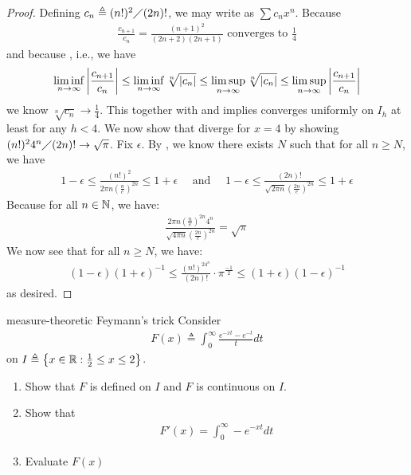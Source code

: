\documentclass{report}
\begin{document}
\begin{proof}
Defining $c_n\triangleq (n!)^2 \diagup (2n)!$, we may write   as $\sum c_n x^n$. Because 
\begin{align*}
\frac{c_{n+1}}{c_n}= \frac{(n+1)^2}{(2n+2)(2n+1)}\text{ converges to }\frac{1}{4}
\end{align*}
and because , i.e., we have 
\begin{align*}
  \liminf_{n\to\infty} \left|\frac{c_{n+1}}{c_n}\right| \leq \liminf_{n\to\infty} \sqrt[n]{\left|c_n\right|}\leq \limsup_{n\to\infty} \sqrt[n]{\left|c_n\right|} \leq \limsup_{n\to\infty} \left|\frac{c_{n+1}}{c_n}\right|
\end{align*}
we know $\sqrt[n]{c_n} \rightarrow \frac{1}{4} $. This together with  and  implies  converges uniformly on $I_h$ at least for any $h<4$. We now show that  diverge for $x=4$ by showing $(n!)^24^n \diagup (2n)! \rightarrow \sqrt{\pi }$. Fix $\epsilon $. By , we know there exists $N$ such that for all  $n\geq N$, we have  
\begin{align*}
1-\epsilon  \leq \frac{(n!)^2}{2\pi  n\left( \frac{n}{e} \right)^{2n} }  \leq 1+\epsilon \quad \text{ and }\quad  1- \epsilon \leq \frac{(2n)!}{\sqrt{2\pi  n} \left(\frac{2n}{e} \right)^{2n} }  \leq 1+\epsilon 
\end{align*}
Because for all $n\in\mathbb{N}$, we have: 
\begin{align*}
\frac{2\pi  n \left( \frac{n}{e} \right)^{2n} 4^n}{\sqrt{ 4\pi n  }  \left(\frac{2n}{e} \right)^{2n}}=  \sqrt{\pi } 
\end{align*}
We now see that for all $n\geq N$, we have: 
\begin{align*}
  (1-\epsilon )(1+\epsilon )^{-1} \leq \frac{(n!)^24^n}{(2n)!} \cdot \pi  ^{\frac{-1}{2}} \leq (1+\epsilon )(1-\epsilon )^{-1}
\end{align*}
as desired.
\end{proof}
\begin{question}{measure-theoretic Feymann's trick}{}
Consider 
\begin{align*}
F(x)\triangleq \int_0^{\infty} \frac{e^{-xt}-e^{-t}}{t}dt
\end{align*}
on $I\triangleq \left\{ x\in\mathbb{R}:\frac{1}{2}\leq x\leq 2 \right\}$. 
\begin{enumerate}[label=(\roman*)]
  \item Show that $F$ is defined on $I$ and  $F$ is continuous on $I$.  
  \item Show that 
    \begin{align*}
    F'(x)=\int_0^{\infty} -e^{-xt} dt
    \end{align*} 
    \item Evaluate $F(x)$
\end{enumerate}
\end{question}
\end{document}
